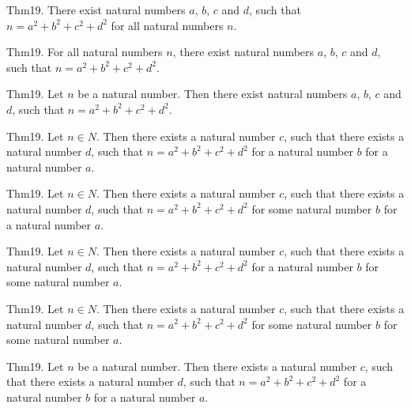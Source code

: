 \documentclass{article}
\begin{document}
Thm19. There exist natural numbers $a$, $b$, $c$ and $d$, such that $n = a ^{ 2}+ b ^{ 2}+ c ^{ 2}+ d ^{ 2}$ for all natural numbers $n$.

Thm19. For all natural numbers $n$, there exist natural numbers $a$, $b$, $c$ and $d$, such that $n = a ^{ 2}+ b ^{ 2}+ c ^{ 2}+ d ^{ 2}$.

Thm19. Let $n$ be a natural number. Then there exist natural numbers $a$, $b$, $c$ and $d$, such that $n = a ^{ 2}+ b ^{ 2}+ c ^{ 2}+ d ^{ 2}$.

Thm19. Let $n \in N$. Then there exists a natural number $c$, such that there exists a natural number $d$, such that $n = a ^{ 2}+ b ^{ 2}+ c ^{ 2}+ d ^{ 2}$ for a natural number $b$ for a natural number $a$.

Thm19. Let $n \in N$. Then there exists a natural number $c$, such that there exists a natural number $d$, such that $n = a ^{ 2}+ b ^{ 2}+ c ^{ 2}+ d ^{ 2}$ for some natural number $b$ for a natural number $a$.

Thm19. Let $n \in N$. Then there exists a natural number $c$, such that there exists a natural number $d$, such that $n = a ^{ 2}+ b ^{ 2}+ c ^{ 2}+ d ^{ 2}$ for a natural number $b$ for some natural number $a$.

Thm19. Let $n \in N$. Then there exists a natural number $c$, such that there exists a natural number $d$, such that $n = a ^{ 2}+ b ^{ 2}+ c ^{ 2}+ d ^{ 2}$ for some natural number $b$ for some natural number $a$.

Thm19. Let $n$ be a natural number. Then there exists a natural number $c$, such that there exists a natural number $d$, such that $n = a ^{ 2}+ b ^{ 2}+ c ^{ 2}+ d ^{ 2}$ for a natural number $b$ for a natural number $a$.
\end{document}
